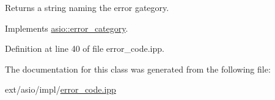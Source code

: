 Returns a string naming the error gategory. 



Implements \hyperlink{classasio_1_1error__category_a556b6099e1cc2d1cfb22e4ef2c9b0947}{asio\+::error\+\_\+category}.



Definition at line 40 of file error\+\_\+code.\+ipp.



The documentation for this class was generated from the following file\+:\begin{DoxyCompactItemize}
\item 
ext/asio/impl/\hyperlink{error__code_8ipp}{error\+\_\+code.\+ipp}\end{DoxyCompactItemize}

